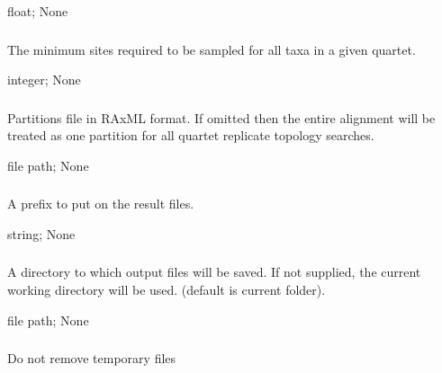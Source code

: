 \documentclass[letterpaper,12pt,english]{sphinxmanual}
\begin{document}
 float;  None


\subsubsection{}
\label{\detokenize{prog_desc:min-overlap}}
 The minimum sites required to be sampled for all taxa in a given quartet.

 integer;  None


\subsubsection{}
\label{\detokenize{prog_desc:partitions}}
 Partitions file in RAxML format. If omitted then the entire alignment will be treated as one partition for all quartet replicate topology searches.

 file path;  None


\subsubsection{}
\label{\detokenize{prog_desc:result-prefix}}
 A prefix to put on the result files.

 string;  None


\subsubsection{}
\label{\detokenize{prog_desc:results-dir}}
 A directory to which output files will be saved. If not supplied, the current working directory will be used. (default is current folder).

 file path;  None


\subsubsection{}
\label{\detokenize{prog_desc:retain-temp}}
 Do not remove temporary files
\end{document}
